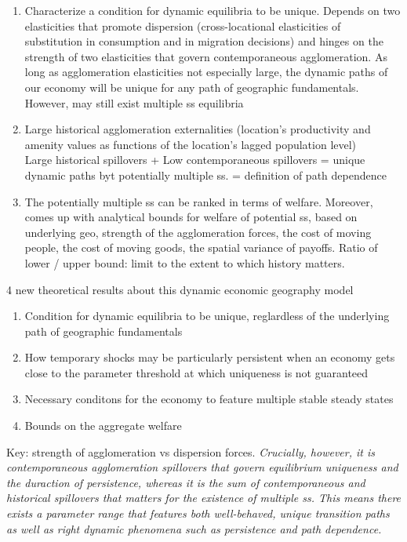 \documentclass[12pt, final]{article}
\begin{document}
\begin{enumerate}[1.]
    \item Characterize a condition for dynamic equilibria to be unique. Depends on two elasticities that promote dispersion (cross-locational elasticities of substitution in consumption and in migration decisions) and hinges on the strength of two elasticities that govern contemporaneous agglomeration. 
    As long as agglomeration elasticities not especially large, the dynamic paths of our economy will be unique for any path of geographic fundamentals. However, may still exist multiple ss equilibria
    \item Large historical agglomeration externalities (location's productivity and amenity values as functions of the location's lagged population level)\\
    Large historical spillovers + Low contemporaneous spillovers = unique dynamic paths byt potentially multiple ss. = definition of path dependence
    \item The potentially multiple ss can be ranked in terms of welfare. Moreover, comes up with analytical bounds for welfare of potential ss, based on underlying geo, strength of the agglomeration forces, the cost of moving people, the cost of moving goods, the spatial variance of payoffs. Ratio of lower / upper bound: limit to the extent to which history matters.
\end{enumerate}
4 new theoretical results about this dynamic economic geography model
\begin{enumerate}
    \item Condition for dynamic equilibria to be unique, reglardless of the underlying path of geographic fundamentals
    \item How temporary shocks may be particularly persistent when an economy gets close to the parameter threshold at which uniqueness is not guaranteed
    \item Necessary conditons for the economy to feature multiple stable steady states
    \item Bounds on the aggregate welfare
\end{enumerate}
Key: strength of agglomeration vs dispersion forces. \textit{Crucially, however, it is contemporaneous agglomeration spillovers that govern equilibrium uniqueness and the duraction of persistence, whereas it is the sum of contemporaneous and historical spillovers that matters for the existence of multiple ss. This means there exists a parameter range that features both well-behaved, unique transition paths as well as right dynamic phenomena such as persistence and path dependence.}
\end{document}
